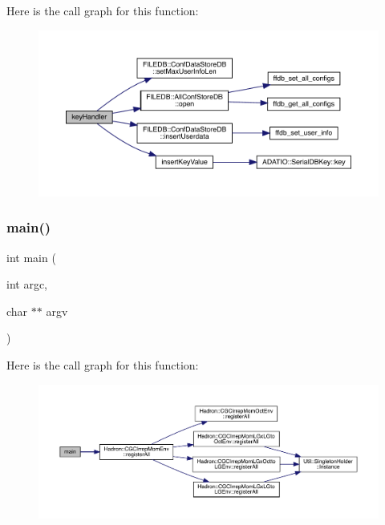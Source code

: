 Here is the call graph for this function\+:
\nopagebreak
\begin{figure}[H]
\begin{center}
\leavevmode
\includegraphics[width=350pt]{d5/d98/adat-devel_2main_2dbutil_2dbavg_8cc_a57918e290614430413950cb4fdfd967e_cgraph}
\end{center}
\end{figure}
\mbox{\label{adat-devel_2main_2dbutil_2dbavg_8cc_a3c04138a5bfe5d72780bb7e82a18e627}} 
\subsubsection{\texorpdfstring{main()}{main()}}
{\footnotesize\ttfamily int main (\begin{DoxyParamCaption}\item[{int}]{argc,  }\item[{char $\ast$$\ast$}]{argv }\end{DoxyParamCaption})}

Here is the call graph for this function\+:
\nopagebreak
\begin{figure}[H]
\begin{center}
\leavevmode
\includegraphics[width=350pt]{d5/d98/adat-devel_2main_2dbutil_2dbavg_8cc_a3c04138a5bfe5d72780bb7e82a18e627_cgraph}
\end{center}
\end{figure}
\mbox{\label{adat-devel_2main_2dbutil_2dbavg_8cc_ad99136392a8c4064c84803fee6e0c857}} 
